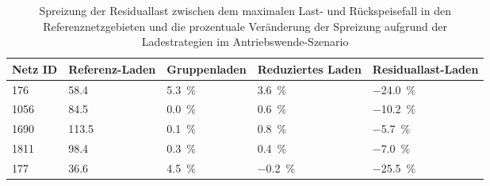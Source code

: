 {
\renewcommand{\arraystretch}{1.2}%
\begin{table}[H]
	\begin{center}
		\caption{Spreizung der Residuallast zwischen dem maximalen Last- und Rückspeisefall in den Referenznetzgebieten und die prozentuale Veränderung der Spreizung aufgrund der Ladestrategien im Antriebswende-Szenario}
		\begin{tabu} to \textwidth {X[0.5] X[1, r] X[1, r] X[1.2, r] X[1.2, r]}
			\toprule
			Netz ID    & Referenz-Laden  & Gruppenladen                              & Reduziertes Laden                          & Residuallast-Laden                         \\ \midrule
			\num{176}  & \SI{58.4}{\mw}  & \SI[retain-explicit-plus]{+5.3}{\percent} & \SI[retain-explicit-plus]{+3.6}{\percent}  & \SI[retain-explicit-plus]{-24.0}{\percent} \\
			\num{1056} & \SI{84.5}{\mw}  & \SI[retain-explicit-plus]{+0.0}{\percent} & \SI[retain-explicit-plus]{+0.6}{\percent}  & \SI[retain-explicit-plus]{-10.2}{\percent} \\
			\num{1690} & \SI{113.5}{\mw} & \SI[retain-explicit-plus]{+0.1}{\percent} & \SI[retain-explicit-plus]{+0.8}{\percent}  & \SI[retain-explicit-plus]{-5.7}{\percent}  \\
			\num{1811} & \SI{98.4}{\mw}  & \SI[retain-explicit-plus]{+0.3}{\percent} & \SI[retain-explicit-plus]{+0.4}{\percent}  & \SI[retain-explicit-plus]{-7.0}{\percent}  \\
			\num{177}  & \SI{36.6}{\mw}  & \SI[retain-explicit-plus]{+4.5}{\percent} & \SI[retain-explicit-plus]{-0.2}{\percent}  & \SI[retain-explicit-plus]{-25.5}{\percent} \\ \bottomrule
		\end{tabu}
		\label{tab:ResidualLoadSpread}
	\end{center}
	\vspace{-3mm}%
\end{table}
}